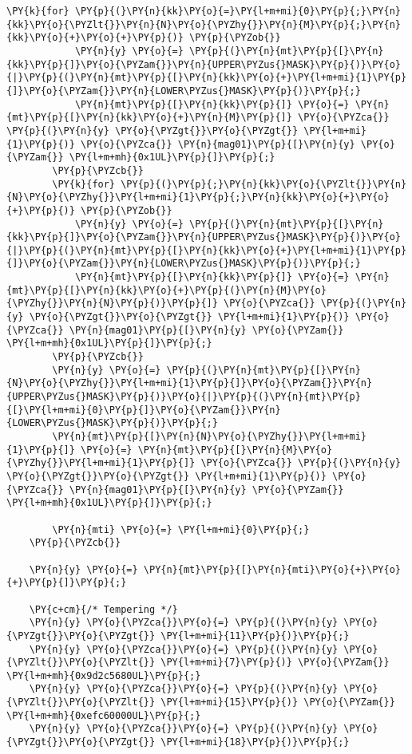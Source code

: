 \begin{Verbatim}[commandchars=\\\{\}]
        \PY{k}{for} \PY{p}{(}\PY{n}{kk}\PY{o}{=}\PY{l+m+mi}{0}\PY{p}{;}\PY{n}{kk}\PY{o}{\PYZlt{}}\PY{n}{N}\PY{o}{\PYZhy{}}\PY{n}{M}\PY{p}{;}\PY{n}{kk}\PY{o}{+}\PY{o}{+}\PY{p}{)} \PY{p}{\PYZob{}}
            \PY{n}{y} \PY{o}{=} \PY{p}{(}\PY{n}{mt}\PY{p}{[}\PY{n}{kk}\PY{p}{]}\PY{o}{\PYZam{}}\PY{n}{UPPER\PYZus{}MASK}\PY{p}{)}\PY{o}{|}\PY{p}{(}\PY{n}{mt}\PY{p}{[}\PY{n}{kk}\PY{o}{+}\PY{l+m+mi}{1}\PY{p}{]}\PY{o}{\PYZam{}}\PY{n}{LOWER\PYZus{}MASK}\PY{p}{)}\PY{p}{;}
            \PY{n}{mt}\PY{p}{[}\PY{n}{kk}\PY{p}{]} \PY{o}{=} \PY{n}{mt}\PY{p}{[}\PY{n}{kk}\PY{o}{+}\PY{n}{M}\PY{p}{]} \PY{o}{\PYZca{}} \PY{p}{(}\PY{n}{y} \PY{o}{\PYZgt{}}\PY{o}{\PYZgt{}} \PY{l+m+mi}{1}\PY{p}{)} \PY{o}{\PYZca{}} \PY{n}{mag01}\PY{p}{[}\PY{n}{y} \PY{o}{\PYZam{}} \PY{l+m+mh}{0x1UL}\PY{p}{]}\PY{p}{;}
        \PY{p}{\PYZcb{}}
        \PY{k}{for} \PY{p}{(}\PY{p}{;}\PY{n}{kk}\PY{o}{\PYZlt{}}\PY{n}{N}\PY{o}{\PYZhy{}}\PY{l+m+mi}{1}\PY{p}{;}\PY{n}{kk}\PY{o}{+}\PY{o}{+}\PY{p}{)} \PY{p}{\PYZob{}}
            \PY{n}{y} \PY{o}{=} \PY{p}{(}\PY{n}{mt}\PY{p}{[}\PY{n}{kk}\PY{p}{]}\PY{o}{\PYZam{}}\PY{n}{UPPER\PYZus{}MASK}\PY{p}{)}\PY{o}{|}\PY{p}{(}\PY{n}{mt}\PY{p}{[}\PY{n}{kk}\PY{o}{+}\PY{l+m+mi}{1}\PY{p}{]}\PY{o}{\PYZam{}}\PY{n}{LOWER\PYZus{}MASK}\PY{p}{)}\PY{p}{;}
            \PY{n}{mt}\PY{p}{[}\PY{n}{kk}\PY{p}{]} \PY{o}{=} \PY{n}{mt}\PY{p}{[}\PY{n}{kk}\PY{o}{+}\PY{p}{(}\PY{n}{M}\PY{o}{\PYZhy{}}\PY{n}{N}\PY{p}{)}\PY{p}{]} \PY{o}{\PYZca{}} \PY{p}{(}\PY{n}{y} \PY{o}{\PYZgt{}}\PY{o}{\PYZgt{}} \PY{l+m+mi}{1}\PY{p}{)} \PY{o}{\PYZca{}} \PY{n}{mag01}\PY{p}{[}\PY{n}{y} \PY{o}{\PYZam{}} \PY{l+m+mh}{0x1UL}\PY{p}{]}\PY{p}{;}
        \PY{p}{\PYZcb{}}
        \PY{n}{y} \PY{o}{=} \PY{p}{(}\PY{n}{mt}\PY{p}{[}\PY{n}{N}\PY{o}{\PYZhy{}}\PY{l+m+mi}{1}\PY{p}{]}\PY{o}{\PYZam{}}\PY{n}{UPPER\PYZus{}MASK}\PY{p}{)}\PY{o}{|}\PY{p}{(}\PY{n}{mt}\PY{p}{[}\PY{l+m+mi}{0}\PY{p}{]}\PY{o}{\PYZam{}}\PY{n}{LOWER\PYZus{}MASK}\PY{p}{)}\PY{p}{;}
        \PY{n}{mt}\PY{p}{[}\PY{n}{N}\PY{o}{\PYZhy{}}\PY{l+m+mi}{1}\PY{p}{]} \PY{o}{=} \PY{n}{mt}\PY{p}{[}\PY{n}{M}\PY{o}{\PYZhy{}}\PY{l+m+mi}{1}\PY{p}{]} \PY{o}{\PYZca{}} \PY{p}{(}\PY{n}{y} \PY{o}{\PYZgt{}}\PY{o}{\PYZgt{}} \PY{l+m+mi}{1}\PY{p}{)} \PY{o}{\PYZca{}} \PY{n}{mag01}\PY{p}{[}\PY{n}{y} \PY{o}{\PYZam{}} \PY{l+m+mh}{0x1UL}\PY{p}{]}\PY{p}{;}

        \PY{n}{mti} \PY{o}{=} \PY{l+m+mi}{0}\PY{p}{;}
    \PY{p}{\PYZcb{}}
  
    \PY{n}{y} \PY{o}{=} \PY{n}{mt}\PY{p}{[}\PY{n}{mti}\PY{o}{+}\PY{o}{+}\PY{p}{]}\PY{p}{;}

    \PY{c+cm}{/* Tempering */}
    \PY{n}{y} \PY{o}{\PYZca{}}\PY{o}{=} \PY{p}{(}\PY{n}{y} \PY{o}{\PYZgt{}}\PY{o}{\PYZgt{}} \PY{l+m+mi}{11}\PY{p}{)}\PY{p}{;}
    \PY{n}{y} \PY{o}{\PYZca{}}\PY{o}{=} \PY{p}{(}\PY{n}{y} \PY{o}{\PYZlt{}}\PY{o}{\PYZlt{}} \PY{l+m+mi}{7}\PY{p}{)} \PY{o}{\PYZam{}} \PY{l+m+mh}{0x9d2c5680UL}\PY{p}{;}
    \PY{n}{y} \PY{o}{\PYZca{}}\PY{o}{=} \PY{p}{(}\PY{n}{y} \PY{o}{\PYZlt{}}\PY{o}{\PYZlt{}} \PY{l+m+mi}{15}\PY{p}{)} \PY{o}{\PYZam{}} \PY{l+m+mh}{0xefc60000UL}\PY{p}{;}
    \PY{n}{y} \PY{o}{\PYZca{}}\PY{o}{=} \PY{p}{(}\PY{n}{y} \PY{o}{\PYZgt{}}\PY{o}{\PYZgt{}} \PY{l+m+mi}{18}\PY{p}{)}\PY{p}{;}


\end{Verbatim}
